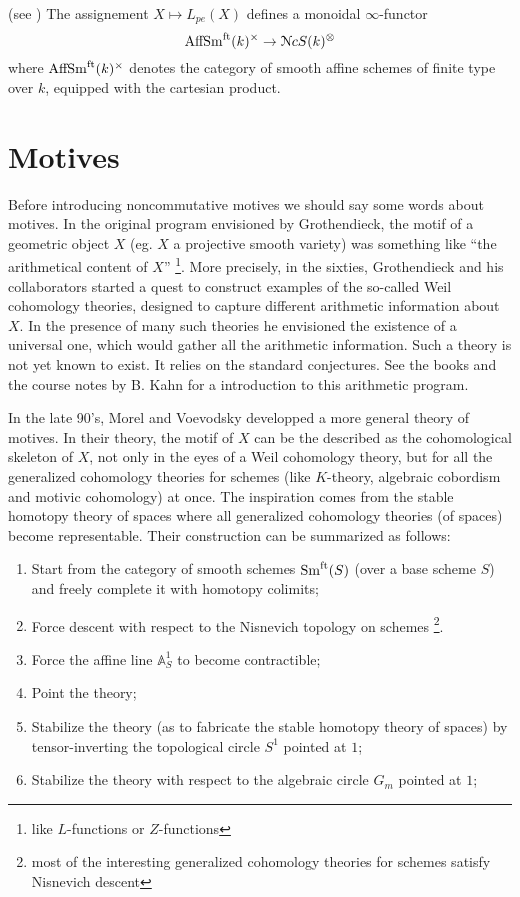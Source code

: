 \begin{refsection}
\begin{prop}(see \cite[6.38]{nc1})
The assignement $X\mapsto L_{pe}(X)$ defines a monoidal $\infty$-functor 
$$\mathrm{AffSm}^{\mathrm{ft}}(k)^{\times}\to \mathcal{N}cS(k)^{\otimes}$$
\noindent where $\mathrm{AffSm}^{\mathrm{ft}}(k)^{\times}$ denotes the category of smooth affine schemes of finite type over $k$, equipped with the cartesian product.
\end{prop}



\section{Motives}

Before introducing noncommutative motives we should say some words about motives. In the original program envisioned by Grothendieck, the motif of a geometric object $X$ (eg. $X$ a projective smooth variety) was something like ``the arithmetical content of $X$'' \footnote{like $L$-functions or $Z$-functions}. More precisely, in the sixties, Grothendieck and his collaborators started a quest to construct examples of the so-called Weil cohomology theories, designed to capture different arithmetic information about $X$. In the presence of many such theories he envisioned the existence of a universal one, which would gather all the arithmetic information. Such a theory is not yet known to exist. It relies on the standard conjectures. See the books \cite{MR2115000, motivesSeattle} and the course notes by B. Kahn \cite{kahnzetamotives} for a introduction to this arithmetic program.

In the late 90's, Morel and Voevodsky \cite{voevodsky-morel} developped a more general theory of motives. In their theory, the motif of $X$ can be the described as the cohomological skeleton of $X$, not only in the eyes of a Weil cohomology theory, but for all the generalized cohomology theories for schemes (like $K$-theory, algebraic cobordism and motivic cohomology) at once. The inspiration comes from the stable homotopy theory of spaces where all generalized cohomology theories (of spaces) become representable. Their construction can be summarized as follows:

\begin{enumerate}
\item Start from the category of smooth schemes $\mathrm{Sm}^\mathrm{ft}(S)$ (over a base scheme $S$) and freely complete it with homotopy colimits;
\item Force descent with respect to the Nisnevich topology on schemes \footnote{most of the interesting generalized cohomology theories for schemes satisfy Nisnevich descent}.
\item Force the affine line $\mathbb{A}^1_S$ to become contractible;
\item Point the theory;
\item Stabilize the theory (as to fabricate the stable homotopy theory of spaces) by tensor-inverting the topological circle $S^1$ pointed at $1$;
\item Stabilize the theory with respect to the algebraic circle $G_m$ pointed at $1$;  
\end{enumerate}


\end{refsection}
